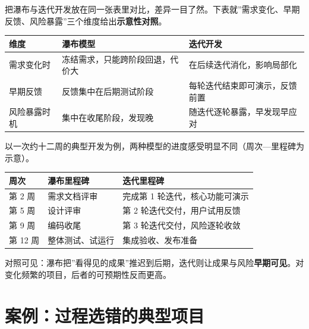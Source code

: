 \documentclass[12pt,a4paper,twoside,openany]{ctexbook}
\numberwithin{figure}{chapter}
\numberwithin{table}{chapter}
\newcounter{none}
\begin{document}
把瀑布与迭代开发放在同一张表里对比，差异一目了然。下表就''需求变化、早期反馈、风险暴露''三个维度给出\textbf{示意性对照}。

{\def\LTcaptype{none} %
\begin{longtable}[]{@{}
  >{\raggedright\arraybackslash}p{}
  >{\raggedright\arraybackslash}p{}
  >{\raggedright\arraybackslash}p{}@{}}
\toprule\noalign{}
\begin{minipage}[b]{\linewidth}\raggedright
维度
\end{minipage} & \begin{minipage}[b]{\linewidth}\raggedright
瀑布模型
\end{minipage} & \begin{minipage}[b]{\linewidth}\raggedright
迭代开发
\end{minipage} \\
\midrule\noalign{}
\endhead
\bottomrule\noalign{}
\endlastfoot
需求变化时 & 冻结需求，只能跨阶段回退，代价大 &
在后续迭代消化，影响局部化 \\
早期反馈 & 反馈集中在后期测试阶段 & 每轮迭代结束即可演示，反馈前置 \\
风险暴露时机 & 集中在收尾阶段，发现晚 & 随迭代逐轮暴露，早发现早应对 \\
\end{longtable}
}

以一次约十二周的典型开发为例，两种模型的进度感受明显不同（周次---里程碑为示意）。

{\def\LTcaptype{none} %
\begin{longtable}[]{@{}lll@{}}
\toprule\noalign{}
周次 & 瀑布里程碑 & 迭代里程碑 \\
\midrule\noalign{}
\endhead
\bottomrule\noalign{}
\endlastfoot
第 2 周 & 需求文档评审 & 完成第 1 轮迭代，核心功能可演示 \\
第 5 周 & 设计评审 & 第 2 轮迭代交付，用户试用反馈 \\
第 9 周 & 编码收尾 & 第 3 轮迭代交付，风险逐轮收敛 \\
第 12 周 & 整体测试、试运行 & 集成验收、发布准备 \\
\end{longtable}
}

对照可见：瀑布把''看得见的成果''推迟到后期，迭代则让成果与风险\textbf{早期可见}。对变化频繁的项目，后者的可预期性反而更高。

\section{案例：过程选错的典型项目}\label{ux6848ux4f8bux8fc7ux7a0bux9009ux9519ux7684ux5178ux578bux9879ux76ee}
\end{document}
